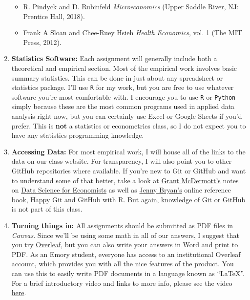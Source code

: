 \documentclass[11pt,]{article}
\providecommand{\tightlist}{%
  \setlength{\itemsep}{0pt}\setlength{\parskip}{0pt}}
\begin{document}
\begin{enumerate}
  \begin{itemize}
  \tightlist
  \item
    R. Pindyck and D. Rubinfeld \emph{Microeconomics} (Upper Saddle
    River, NJ: Prentice Hall, 2018).
  \item
    Frank A Sloan and Chee-Ruey Hsieh \emph{Health Economics}, vol. 1
    (The MIT Press, 2012).
  \end{itemize}
\item
  \textbf{Statistics Software:} Each assignment will generally include
  both a theoretical and empirical section. Most of the empirical work
  involves basic summary statistics. This can be done in just about any
  spreadsheet or statistics package. I'll use \texttt{R} for my work,
  but you are free to use whatever software you're most comfortable
  with. I encourage you to use \texttt{R} or \texttt{Python} simply
  because these are the most common programs used in applied data
  analysis right now, but you can certainly use Excel or Google Sheets
  if you'd prefer. This is \textbf{not} a statistics or econometrics
  class, so I do not expect you to have any statistics programming
  knowledge.
\item
  \textbf{Accessing Data:} For most empirical work, I will house all of
  the links to the data on our class website. For transparency, I will
  also point you to other GitHub repositories where available. If you're
  new to Git or GitHub and want to understand some of that better, take
  a look at \href{https://grantmcdermott.com/}{Grant McDermott's} notes
  on \href{https://github.com/uo-ec607/lectures}{Data Science for
  Economists} as well as \href{https://jennybryan.org/}{Jenny Bryan's}
  online reference book, \href{https://happygitwithr.com/}{Happy Git and
  GitHub with R}. But again, knowledge of Git or GitHub is not part of
  this class.
\item
  \textbf{Turning things in:} All assignments should be submitted as PDF
  files in \emph{Canvas}. Since we'll be using some math in all of our
  answers, I suggest that you try
  \href{https://www.overleaf.com/}{Overleaf}, but you can also write
  your answers in Word and print to PDF. As an Emory student, everyone
  has access to an institutional Overleaf account, which provides you
  with all the nice features of the product. You can use this to easily
  write PDF documents in a language known as ``LaTeX''. For a brief
  introductory video and links to more info, please see the video
  \href{https://www.overleaf.com/learn/latex/Questions/Getting_started_with_LaTeX_and_Overleaf_(formerly_writeLaTeX)}{here}.
\end{enumerate}
\end{document}
